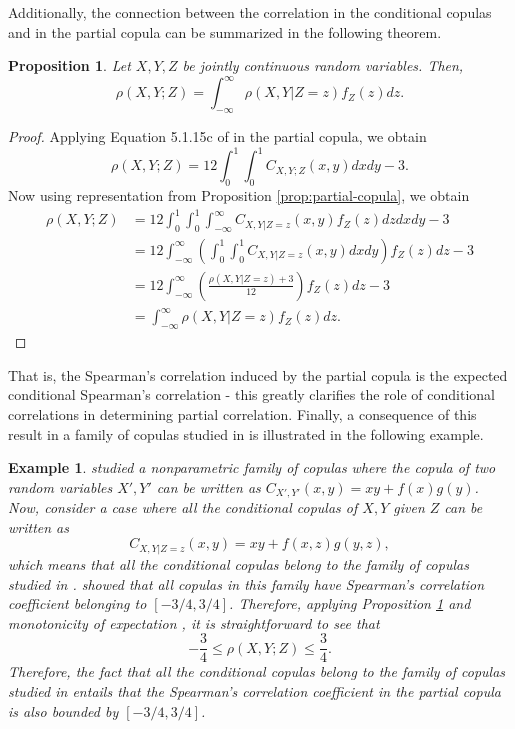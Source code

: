 \documentclass[
]{article}
\newtheorem{proposition}{Proposition}
\newtheorem{example}{Example}
\begin{document}
Additionally, the connection between the correlation in the conditional
copulas and in the partial copula can be summarized in the following
theorem.

\begin{proposition}\label{prop:spearman-partial-conditional}
Let $X, Y, Z$ be jointly continuous random variables. Then,
$$\rho(X, Y; Z) = \int_{-\infty}^{\infty} \rho(X, Y | Z = z) f_Z(z) dz.$$
\end{proposition}

\begin{proof}
Applying Equation 5.1.15c of \citet{nelsen2006} in the partial copula, we obtain
$$\rho(X, Y; Z) = 12 \int_0^1 \int_0^1 C_{X,Y;Z}(x, y) dx dy - 3.$$
Now using representation from Proposition \ref{prop:partial-copula}, we obtain
\begin{align*}
\rho(X, Y; Z) &= 12 \int_0^1 \int_0^1 \int_{-\infty}^{\infty} C_{X,Y|Z=z}(x, y) f_Z(z) dz dx dy - 3 \\
&= 12 \int_{-\infty}^{\infty} \left(\int_0^1 \int_0^1 C_{X,Y|Z=z}(x, y) dx dy \right) f_Z(z) dz - 3 \\
&= 12 \int_{-\infty}^{\infty} \left(\frac{\rho(X, Y | Z = z) + 3}{12}\right) f_Z(z) dz - 3 \\
&= \int_{-\infty}^{\infty} \rho(X, Y | Z = z) f_Z(z) dz.
\end{align*}
\end{proof}

That is, the Spearman's correlation induced by the partial copula is the
expected conditional Spearman's correlation - this greatly clarifies the
role of conditional correlations in determining partial correlation.
Finally, a consequence of this result in a family of copulas studied in
\citet{rodriguezlallena2004} is illustrated in the following example.

\begin{example}
\cite{rodriguezlallena2004} studied a nonparametric family of copulas where the copula of two random variables $X',Y'$ can be written as $C_{X',Y'}(x, y) = xy + f(x)g(y)$. Now, consider a case where all the conditional copulas of $X,Y$ given $Z$ can be written as
$$C_{X,Y|Z=z}(x, y) = xy + f(x,z)g(y,z),$$
which means that all the conditional copulas belong to the family of copulas studied in \cite{rodriguezlallena2004}. \cite{komelj2010} showed that all copulas in this family have Spearman's correlation coefficient belonging to $[-3/4, 3/4]$. Therefore, applying Proposition \ref{prop:spearman-partial-conditional} and monotonicity of expectation \citep[property E2 of section 3.3 of][]{james1981}, it is straightforward to see that
$$-\frac{3}{4} \leq \rho(X, Y; Z) \leq \frac{3}{4}.$$
Therefore, the fact that all the conditional copulas belong to the family of copulas studied in \cite{rodriguezlallena2004} entails that the Spearman's correlation coefficient in the partial copula is also bounded by $[-3/4, 3/4]$.
\end{example}
\end{document}
